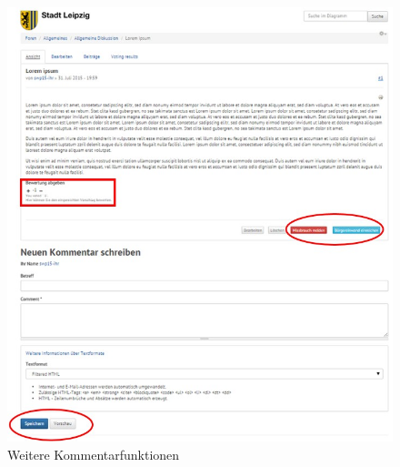 \documentclass[a4paper,11pt,twoside]{article}
\begin{document}
\begin{figure}[ht]
\begin{center}
  \includegraphics[width=\textwidth]{Bilder/comment.jpg}
\end{center}
  \caption{Weitere Kommentarfunktionen}
\end{figure}
\end{document}

